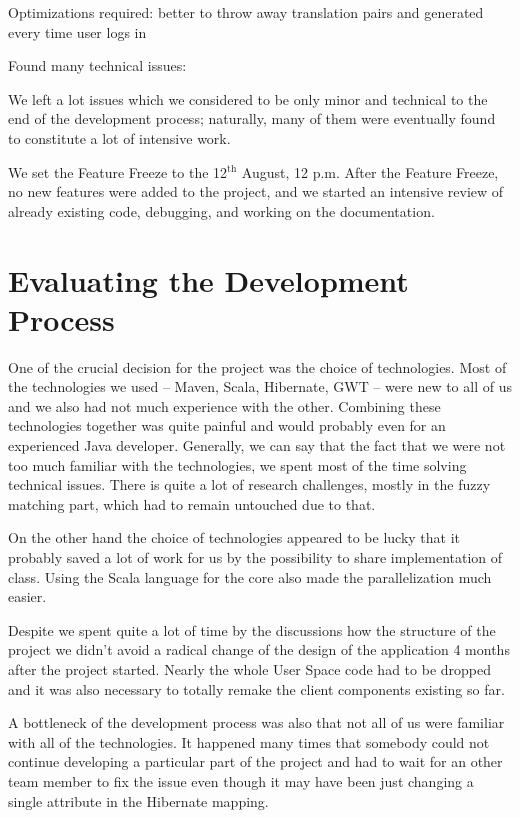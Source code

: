 Optimizations required: better to throw away translation pairs and generated every time user logs in

Found many technical issues: %


We left
a lot issues which we considered to be only minor and technical
to the end of the development process;
naturally, many of them were eventually found to constitute a lot of intensive work.

We set the Feature Freeze to the 12$^\mathrm{th}$ August, 12 p.m.
After the Feature Freeze, no new features were added to the project, and we started an intensive review of already existing code, debugging, and working on the documentation.

\section{Evaluating the Development Process}

One of the crucial decision for the project was the choice of technologies. Most of the technologies we used -- Maven, Scala, Hibernate, GWT -- were new to all of us and we also had not much experience with the other. Combining these technologies together was quite painful and would probably even for an experienced Java developer. Generally, we can say that the fact that we were not too much familiar with the technologies, we spent most of the time solving technical issues. There is quite a lot of research challenges, mostly in the fuzzy matching part, which had to remain untouched due to that.

On the other hand the choice of technologies appeared to be lucky that it probably saved a lot of work for us by the possibility to share implementation of class. Using the Scala language for the core also made the parallelization much easier.

Despite we spent quite a lot of time by the discussions how the structure of the project we didn't avoid a radical change of the design of the application 4 months after the project started. Nearly the whole User Space code had to be dropped and it was also necessary to totally remake the client components existing so far.

A bottleneck of the development process was also that not all of us were familiar with all of the technologies. It happened many times that somebody could not continue developing a particular part of the project and had to wait for an other team member to fix the issue even though it may have been just changing a single attribute in the Hibernate mapping.

